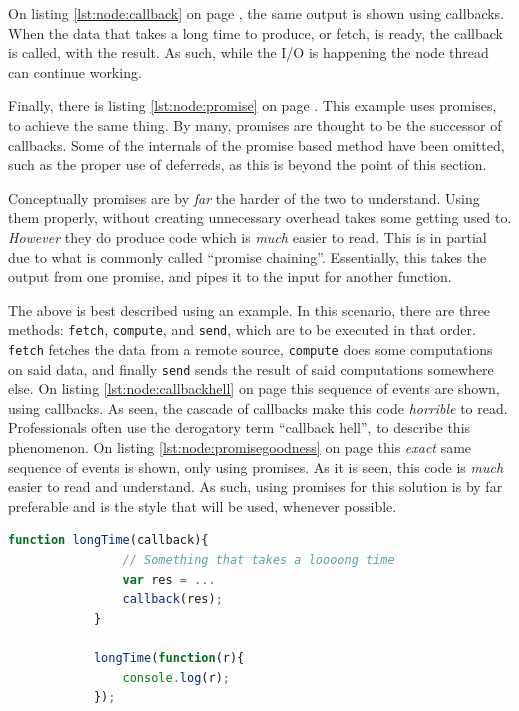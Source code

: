 		On listing \ref{lst:node:callback} on page \pageref{lst:node:callback}, the same output is shown using callbacks. When the data that takes a long time to produce, or fetch, is ready, the callback is called, with the result. As such, while the I/O is happening the node thread can continue working.

		Finally, there is listing \ref{lst:node:promise} on page \pageref{lst:node:callback}. This example uses promises, to achieve the same thing. By many, promises are thought to be the successor of callbacks. Some of the internals of the promise based method have been omitted, such as the proper use of deferreds, as this is beyond the point of this section.

		Conceptually promises are by \emph{far} the harder of the two to understand. Using them properly, without creating unnecessary overhead takes some getting used to. \emph{However} they do produce code which is \emph{much} easier to read. This is in partial due to what is commonly called ``promise chaining''. Essentially, this takes the output from one promise, and pipes it to the input for another function. 

		The above is best described using an example. In this scenario, there are three methods: \verb=fetch=, \verb=compute=, and \verb=send=, which are to be executed in that order. \verb=fetch= fetches the data from a remote source, \verb=compute= does some computations on said data, and finally \verb=send= sends the result of said computations somewhere else. On listing \ref{lst:node:callbackhell} on page \pageref{lst:node:callbackhell} this sequence of events are shown, using callbacks. As seen, the cascade of callbacks make this code \emph{horrible} to read. Professionals often use the derogatory term ``callback hell'', to describe this phenomenon. On listing \ref{lst:node:promisegoodness} on page \pageref{lst:node:promisegoodness} this \emph{exact} same sequence of events is shown, only using promises. As it is seen, this code is \emph{much} easier to read and understand. As such, using promises for this solution is by far preferable and is the style that will be used, whenever possible.


		\begin{lstlisting}[language=Javascript,gobble=12,caption={Using callbacks, in Node.js},label={lst:node:callback}]
            function longTime(callback){
                // Something that takes a loooong time
                var res = ...
                callback(res);
            }
            
            longTime(function(r){
                console.log(r);
            });
		\end{lstlisting}

